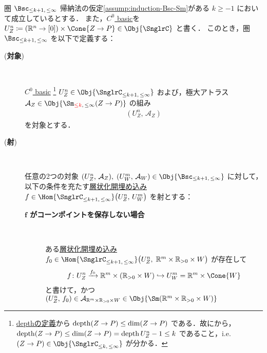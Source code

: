 \documentclass[TQFT_main]{subfiles}
\begin{document}
\begin{mydef}[label=def:Bsc-induction,breakable]{圏 $\Bsc_{\le k+1,\, \le \infty}$}
    帰納法の仮定\ref{assump:induction-Bsc-Sm}がある $k \ge -1$ において成立しているとする．
    また，\hyperref[def:C0-basic]{$C^0$ basic}を $U^n_Z \coloneqq (\mathbb{R}^n \to [0]) \times \Cone{Z \to P} \in \Obj{\SnglrC}$ と書く．
    このとき，圏 $\Bsc_{\le k+1,\, \le \infty}$ を以下で定義する：
    \begin{description}
        \item[(\textbf{対象})]　
        
        \hyperref[def:C0-basic]{$C^0$ basic}
        \footnote{\hyperref[def:dim-depth]{depthの定義}から $\operatorname{depth} (Z \to P) \le \dim (Z \to P)$ である．故にから，$\operatorname{depth} (Z \to P) \le \dim (Z \to P) = \operatorname{depth} U^n_Z - 1 \le k$ であること，i.e. $(Z \to P) \in \Obj{\SnglrC_{\le k,\, \le \infty}}$ が分かる．} $U^n_Z \in \Obj{\SnglrC_{\le k+1,\, \le \infty}}$ および，極大アトラス $\mathcal{A}_Z \in \Obj{\Sm_{\textcolor{red}{\le k},\, \le \infty} (Z \to P)}$ の組み
        \begin{align}
            (U^n_Z,\, \mathcal{A}_Z)
        \end{align}
        を対象とする．

        \item[(\textbf{射})]　
        
        任意の2つの対象 $(U^n_Z,\, \mathcal{A}_Z),\; (U^m_W,\, \mathcal{A}_W) \in \Obj{\Bsc_{\le k+1,\, \le \infty}}$ に対して，以下の条件を充たす\hyperref[def:strat-emb]{層状化開埋め込み} $f \in \Hom{\SnglrC_{\le k+1,\, \le \infty}} \bigl(U^n_Z,\, U^m_W \bigr)$ を射とする：
        \begin{description}
            \item[\textbf{$\bm{f}$ がコーンポイントを保存しない場合}]　  
            
            ある\hyperref[def:strat-emb]{層状化開埋め込み} $f_0 \in \Hom{\SnglrC_{\le k+1,\, \le \infty}} \bigl(U^n_Z,\; \mathbb{R}^m \times \mathbb{R}_{> 0} \times W\bigr)$ が存在して
            \begin{align}
                f \colon U^n_Z \xrightarrow{f_0} \mathbb{R}^m \times (\mathbb{R}_{> 0} \times W) \hookrightarrow U^m_W = \mathbb{R}^m \times \Cone{W}
            \end{align}
            と書けて，かつ $(U^n_Z,\, f_0) \in \mathcal{A}_{\mathbb{R}^m \times \mathbb{R}_{> 0} \times W} \in \Obj{\Sm(\mathbb{R}^m \times \mathbb{R}_{> 0} \times W)}$
            

\end{description}
\end{description}
\end{mydef}
\end{document}
